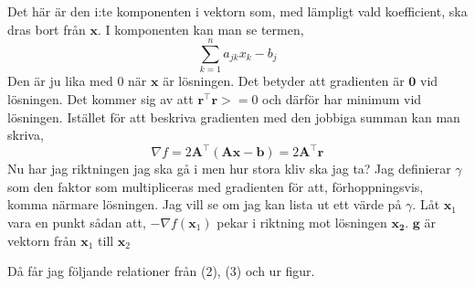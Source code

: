\documentclass{article}
\begin{document}
Det här är den i:te komponenten i vektorn som, med lämpligt vald koefficient, 
ska dras bort från $\mathbf{x}$. I komponenten kan man se termen,
\[
    \sum_{k = 1}^{n} a_{jk} x_k - b_j
\]
Den är ju lika med $0$ när $\mathbf{x}$ är lösningen. Det betyder att gradienten 
är $\mathbf{0}$ vid lösningen. Det kommer sig av att 
$\mathbf{r}^\intercal\mathbf{r}>=0$ och därför har minimum 
vid lösningen.
Istället för att beskriva gradienten med den jobbiga summan kan man skriva,
\begin{equation}
    \nabla f = 2 \mathbf{A}^\intercal (\mathbf{A} \mathbf{x} - \mathbf{b}) =  2 \mathbf{A}^\intercal \mathbf{r}  
\end{equation}
Nu har jag riktningen jag ska gå i men hur stora kliv ska jag ta?
Jag definierar $\gamma$ som den faktor som multipliceras med 
gradienten för att, förhoppningsvis, komma närmare lösningen.
\newpage
Jag vill se om jag kan lista ut ett värde på $\gamma$.
Låt $\mathbf{x}_1$ vara en punkt sådan att, $-\nabla f(\mathbf{x}_1)$ pekar i riktning mot lösningen $\mathbf{x_2}$. 
$\mathbf{g}$ är vektorn från $\mathbf{x}_1$ till $\mathbf{x}_2$
 
Då får jag följande relationer från (2), (3) och ur figur.
 
\end{document}
